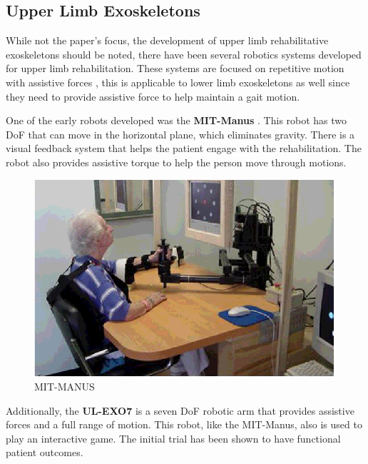 \subsection{Upper Limb Exoskeletons}
While not the paper's focus,  the development of upper limb rehabilitative exoskeletons should be noted, there have been several robotics systems developed for upper limb rehabilitation. These systems are focused on repetitive motion with assistive forces \cite{rehmat2018upper} \cite{krebs2013rehabilitation}, this is applicable to lower limb exoskeletons as well since they need to provide assistive force to help maintain a gait motion. 

One of the early robots developed was the \textbf{MIT-Manus} \cite{krebs2004rehabilitation}. This robot has two DoF that can move in the horizontal plane, which eliminates gravity. There is a visual feedback system that helps the patient engage with the rehabilitation. The robot also provides assistive torque to help the person move through motions.    

\begin{figure}
    \centering
    \includegraphics[scale=0.5]{images/background/MIT-MANUS.png}
    \caption[MIT-MANUS]{MIT-MANUS \cite{MIT-Manus}}
    \label{fig:my_label}
\end{figure}


Additionally, the \textbf{UL-EXO7} is a seven DoF robotic arm that provides assistive forces and a full range of motion. This robot, like the MIT-Manus, also is used to play an interactive game. The initial trial has been shown to have functional patient outcomes. 

